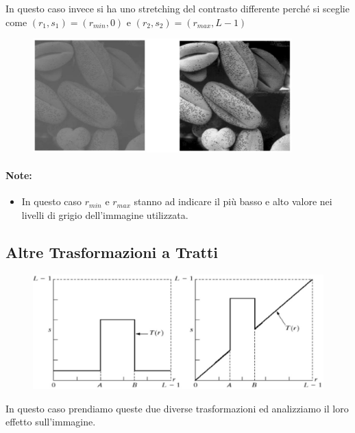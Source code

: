 In questo caso invece si ha uno stretching del contrasto differente perché si
sceglie come $(r_1, s_1) = (r_{min}, 0)$ e $(r_2, s_2) = (r_{max} , L - 1)$

\begin{figure}[H]
    \centering
    \includegraphics[width=10cm, keepaspectratio]{capitoli/immagini/imgs/globuli_rossi.jpg}
\end{figure}

\paragraph{Note:}
\begin{itemize}
    \item In questo caso $r_{min}$ e $r_{max}$ stanno ad indicare il più basso e alto valore
          nei livelli di grigio dell'immagine utilizzata.
\end{itemize}

\subsection{Altre Trasformazioni a Tratti}

\begin{figure}[H]
    \centering
    \includegraphics[width=\linewidth, keepaspectratio]{capitoli/immagini/imgs/trasformazioni_lineari_esempio_7.jpg}
\end{figure}

In questo caso prendiamo queste due diverse trasformazioni ed analizziamo il
loro effetto sull'immagine.

